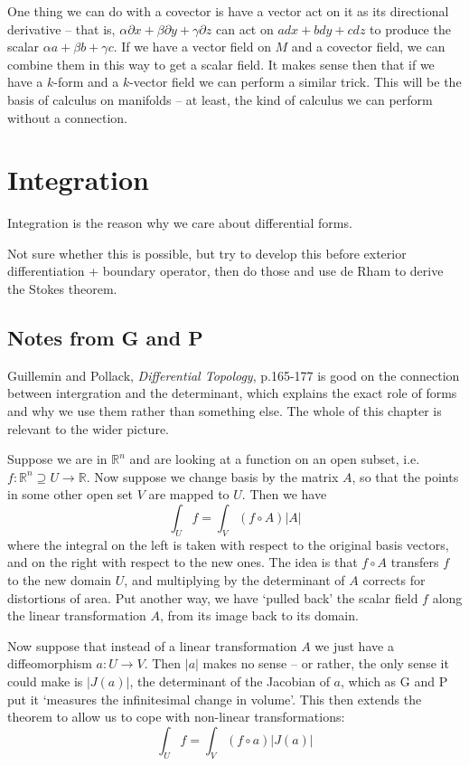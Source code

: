 \documentclass[oneside,english]{amsbook}
\numberwithin{section}{chapter}
\theoremstyle{plain}
\theoremstyle{definition}
\begin{document}
One thing we can do with a covector is have a vector act on it as its directional derivative -- that is, $\alpha\partial x + \beta\partial y + \gamma\partial z$ can act on $adx + bdy + cdz$ to produce the scalar $\alpha a + \beta b + \gamma c$. If we have a vector field on $M$ and a covector field, we can combine them in this way to get a scalar field. It makes sense then that if we have a $k$-form and a $k$-vector field we can perform a similar trick. This will be the basis of calculus on manifolds -- at least, the kind of calculus we can perform without a connection.

\section{Integration}

Integration is the reason why we care about differential forms. 

Not sure whether this is possible, but try to develop this before exterior differentiation + boundary operator, then do those and use de Rham to derive the Stokes theorem.

\subsection{Notes from G and P}

Guillemin and Pollack, \emph{Differential Topology}, p.165-177 is good on the connection between intergration and the determinant, which explains the exact role of forms and why we use them rather than something else. The whole of this chapter is relevant to the wider picture.

Suppose we are in $\mathbb{R}^n$ and are looking at a function on an open subset, i.e. $f:\mathbb{R}^n\supseteq U\to \mathbb{R}$. Now suppose we change basis by the matrix $A$, so that the points in some other open set $V$ are mapped to $U$. Then we have 
\[
	\int_U f = \int_V (f\circ A)|A|
\]
where the integral on the left is taken with respect to the original basis vectors, and on the right with respect to the new ones. The idea is that $f\circ A$ transfers $f$ to the new domain $U$, and multiplying by the determinant of $A$ corrects for distortions of area. Put another way, we have `pulled back' the scalar field $f$ along the linear transformation $A$, from its image back to its domain.

Now suppose that instead of a linear transformation $A$ we just have a diffeomorphism $a:U\to V$. Then $|a|$ makes no sense -- or rather, the only sense it could make is $|J(a)|$, the determinant of the Jacobian of $a$, which as G and P put it `measures the infinitesimal change in volume'. This then extends the theorem to allow us to cope with non-linear transformations:
\[
	\int_U f = \int_V (f\circ a)|J(a)|
\]
\end{document}

